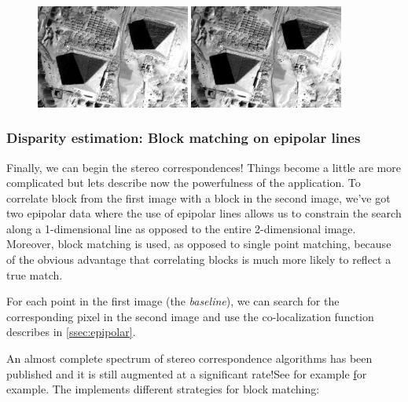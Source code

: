 \begin{figure}[!h]
  \center
  \includegraphics[width=0.45\textwidth]{../Art/MonteverdiImages/stereo_image1_epipolar.png}
  \includegraphics[width=0.45\textwidth]{../Art/MonteverdiImages/stereo_image2_epipolar.png}
  \label{fig:MeanShiftVectorImageFilter}
\end{figure}

\subsubsection{Disparity estimation: Block matching on epipolar lines}

Finally, we can begin the stereo correspondences! Things become a little are
more complicated but lets describe now the powerfulness of the
 application.  To correlate block from the first
image with a block in the second image, we've got two epipolar data where the
use of epipolar lines allows us to constrain the search along a 1-dimensional
line as opposed to the entire 2-dimensional image. Moreover, block matching is
used, as opposed to single point matching, because of the obvious advantage that
correlating blocks is much more likely to reflect a true match.

For each point in the first image (the \textit{baseline}), we can search for the
corresponding pixel in the second image and use the co-localization function
describes in \ref{ssec:epipolar}.

An almost complete spectrum of stereo correspondence algorithms has been
published and it is still augmented at a significant rate!See for example
\href{http://en.wikipedia.org/wiki/Block-matching_algorithm} for example. The
\otb implements different strategies for block matching:

